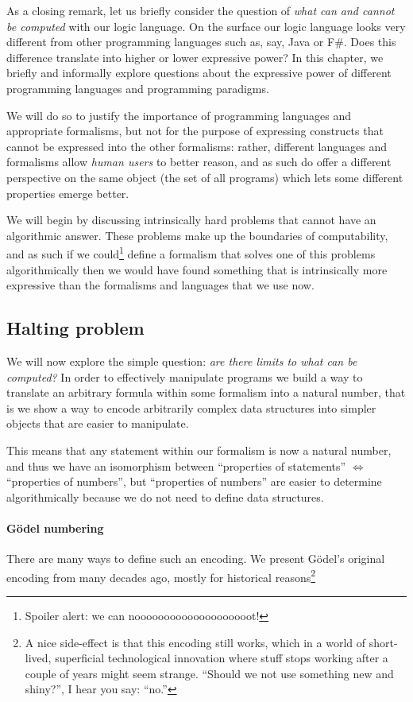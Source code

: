As a closing remark, let us briefly consider the question of \textit{what can and cannot be computed} with our logic language. On the surface our logic language looks very different from other programming languages such as, say, Java or F\#. Does this difference translate into higher or lower expressive power? In this chapter, we briefly and informally explore questions about the expressive power of different programming languages and programming paradigms. 

We will do so to justify the importance of programming languages and appropriate formalisms, but not for the purpose of expressing constructs that cannot be expressed into the other formalisms: rather, different languages and formalisms allow \textit{human users} to better reason, and as such do offer a different perspective on the same object (the set of all programs) which lets some different properties emerge better.

We will begin by discussing intrinsically hard problems that cannot have an algorithmic answer. These problems make up the boundaries of computability, and as such if we could\footnote{Spoiler alert: we can noooooooooooooooooooot!} define a formalism that solves one of this problems algorithmically then we would have found something that is intrinsically more expressive than the formalisms and languages that we use now.


\subsection{Halting problem}
We will now explore the simple question: \textit{are there limits to what can be computed?} In order to effectively manipulate programs we build a way to translate an arbitrary formula within some formalism into a natural number, that is we show a way to encode arbitrarily complex data structures into simpler objects that are easier to manipulate. 

This means that any statement within our formalism is now a natural number, and thus we have an isomorphism between ``properties of statements'' $\Leftrightarrow$ ``properties of numbers'', but ``properties of numbers'' are easier to determine algorithmically because we do not need to define data structures. 

\paragraph{Gödel numbering}
There are many ways to define such an encoding. We present Gödel's original encoding from many decades ago, mostly for historical reasons\footnote{A nice side-effect is that this encoding still works, which in a world of short-lived, superficial technological innovation where stuff stops working after a couple of years might seem strange. ``Should we not use something new and shiny?'', I hear you say: ``no.''}

